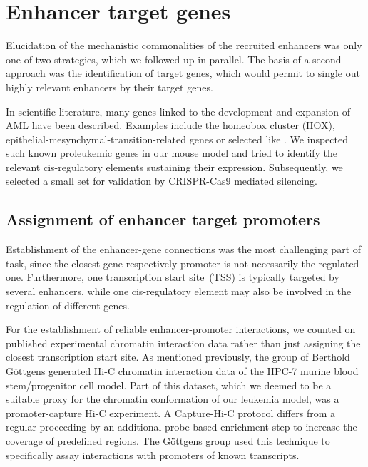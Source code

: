 \chapter{Enhancer target genes}
\label{chap:r:enhancers:targets}
\minitoc

Elucidation of the mechanistic commonalities of the recruited enhancers was only one of two strategies, which we followed up in parallel. The basis of a second approach was the identification of target genes, which would permit to single out highly relevant enhancers by their target genes. 

In scientific literature, many genes linked to the development and expansion of AML have been described. Examples include the homeobox cluster (HOX)\cite{Fujino2001,Adamaki2015}, epithelial-mesynchymal-transition-related genes\cite{Stavropoulou2016} or selected  like \cite{Carter2003,Carter2005}. We inspected such known proleukemic genes in our \mllafnine mouse model and tried to identify the relevant cis-regulatory elements sustaining their expression. Subsequently, we selected a small set for validation by CRISPR-Cas9 mediated silencing. 

\section{Assignment of enhancer target promoters}
\label{chap:r:enhancers:targets:assignment}

Establishment of the enhancer-gene connections was the most challenging part of task, since the closest gene respectively promoter is not necessarily the regulated one\cite{Fullard2019}. Furthermore, one transcription start site~(TSS) is typically targeted by several enhancers, while one cis-regulatory element may also be involved in the regulation of different genes\cite{Bertolino2016,Javierre2016,Allahyar2018}. 

For the establishment of reliable enhancer-promoter interactions, we counted on published experimental chromatin interaction data rather than just assigning the closest transcription start site. As mentioned previously, the group of Berthold Göttgens generated Hi-C chromatin interaction data of the HPC-7 murine blood stem/progenitor cell model\cite{Wilson2016}. Part of this dataset, which we deemed to be a suitable proxy for the chromatin conformation of our \mllafnine \kitpos leukemia model, was a promoter-capture Hi-C experiment. A Capture-Hi-C protocol differs from a regular proceeding by an additional probe-based enrichment step to increase the coverage of predefined regions. The Göttgens group used this technique to specifically assay interactions with promoters of known transcripts. 

